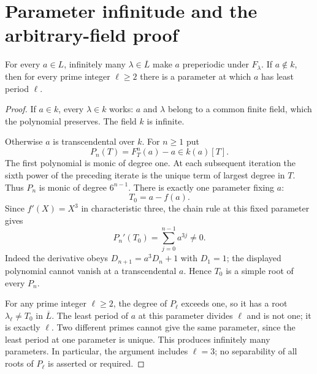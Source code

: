 \section{Parameter infinitude and the arbitrary-field proof}\label{sec:proof}

\begin{lemma}\label{lem:onepoint}
For every $a\in L$, infinitely many $\lambda\in\overline L$ make
$a$ preperiodic under $F_\lambda$. If $a\notin k$, then for every
prime integer $\ell\ge2$ there is a parameter at which $a$ has
least period $\ell$.
\end{lemma}

\begin{proof}
If $a\in k$, every $\lambda\in k$ works: $a$ and $\lambda$
belong to a common finite field, which the polynomial preserves.
The field $k$ is infinite.

Otherwise $a$ is transcendental over $k$. For $n\ge1$ put
\[
 P_n(T)=F_T^n(a)-a\in k(a)[T].
\]
The first polynomial is monic of degree one. At each subsequent
iteration the sixth power of the preceding iterate is the unique
term of largest degree in $T$. Thus $P_n$ is monic of degree
$6^{n-1}$. There is exactly one parameter fixing $a$:
\[
 T_0=a-f(a).
\]
Since $f'(X)=X^3$ in characteristic three, the chain rule at this
fixed parameter gives
\begin{equation}\label{eq:simple}
 P_n'(T_0)=\sum_{j=0}^{n-1}a^{3j}\ne0.
\end{equation}
Indeed the derivative obeys $D_{n+1}=a^3D_n+1$ with $D_1=1$;
the displayed polynomial cannot vanish at a transcendental $a$.
Hence $T_0$ is a simple root of every $P_n$.

For any prime integer $\ell\ge2$, the degree of $P_\ell$ exceeds
one, so it has a root $\lambda_\ell\ne T_0$ in $\overline L$.
The least period of $a$ at this parameter divides $\ell$ and is
not one; it is exactly $\ell$. Two different primes cannot give
the same parameter, since the least period at one parameter is
unique. This produces infinitely many parameters. In particular,
the argument includes $\ell=3$; no separability of all roots of
$P_\ell$ is asserted or required.
\end{proof}

